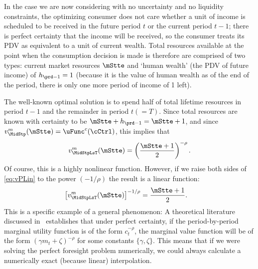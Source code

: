 \documentclass[titlepage, headings=optiontotocandhead]{Resources/texmf-local/tex/latex/econtex}
\begin{document}
In the case we are now considering with no uncertainty and no liquidity constraints, the optimizing consumer does not care whether a unit of income is scheduled to be received in the future period $t$ or the current period $t-1$; there is perfect certainty that the income will be received, so the consumer treats its PDV as equivalent to a unit of current wealth.  Total resources available at the point when the consumption decision is made is therefore are comprised of two types: current market resources $\mStte$ and `human wealth' (the PDV of future income) of $h_{\prd-1}=1$ (because it is the value of human wealth as of the end of the period, there is only one more period of income of 1 left).

The well-known optimal solution is to spend half of total lifetime resources in period $t-1$ and the remainder in period $t (=T)$.  Since total resources are known with certainty to be $\mStte+h_{\prd-1}= \mStte+1$, and since $v_{\MidStp}^{m}(\mStte) = \uFunc^{c}(\cCtrl)$, this implies that
\begin{equation}
  v^{m}_{\MidStpLsT}(\mStte)  = \left(\frac{\mStte+1}{2}\right)^{-\rho} \label{eq:vPLin}.
\end{equation}
Of course, this is a highly nonlinear function.  However, if we raise both sides of \eqref{eq:vPLin} to the power $(-1/\rho)$ the result is a linear function:
\begin{equation}\begin{gathered}\begin{aligned}
      \left[v^{m}_{\MidStpLsT}(\mStte)\right]^{-1/\rho}  & = \frac{\mStte+1}{2}  .
    \end{aligned}\end{gathered}\end{equation}
This is a specific example of a general phenomenon: A theoretical literature discussed in~\cite{ckConcavity} establishes that under perfect certainty, if the period-by-period marginal utility function is of the form $c_{t}^{-\rho}$, the marginal value function will be of the form $(\gamma m_{t}+\zeta)^{-\rho}$ for some constants $\{\gamma,\zeta\}$.  This means that if we were solving the perfect foresight problem numerically, we could always calculate a numerically exact (because linear) interpolation.
\end{document}
